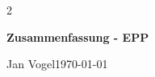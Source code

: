 \documentclass[8pt]{extarticle}
\newcommand{\doctitle}{Zusammenfassung - EPP}
\newcommand{\docauthors}{Jan Vogel}
\newcommand{\docdate}{\today}
\begin{document}
\begin{multicols*}{2}
  {\centering
   {\Large\bfseries \doctitle\par}\vspace{1pt}
   {\footnotesize \docauthors \quad\textbullet\quad \docdate\par}}
  \vspace{4pt}
  
  \vspace{2pt}
  \tableofcontents
  \vspace{3pt}

  
  
  
  
  
  
  
  
  
  
  
\end{multicols*}
\end{document}
